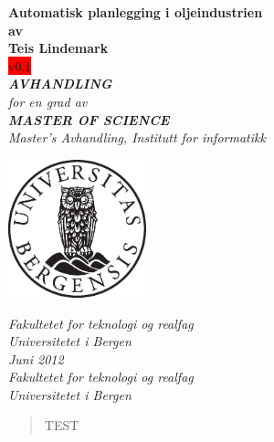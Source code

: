 \documentclass[12pt,twoside,norsk,onecolumn]{article}
\begin{document}
\newcommand{\versjon}{v0.1}

\thispagestyle{empty}
\begin{center}        %
  \vspace{5mm}          %
  \LARGE
  \textbf{Automatisk planlegging i oljeindustrien} \\
  \Large
  \vspace{5mm}
  \textbf{av} \\
  \vspace{5mm}
  \large
  \textbf{Teis Lindemark} \\
  \colorbox{red}{\versjon} \\
  \vspace{30mm}
  \Large
  {\bf{\textsl{AVHANDLING}}} \\
  \textsl{for en grad av} \\
  \vspace{2mm}
  {\bf{\textsl{MASTER OF SCIENCE}}} \\
  \vspace{5mm}
  {\large \textsl {Master's Avhandling, Institutt for informatikk}}\\
  \vspace{10mm}
  \centerline{\includegraphics[width=4cm,height=4cm]{uibugle}}
  \vspace{5mm}
  \textsl{Fakultetet for teknologi og realfag} \\
  \textsl{Universitetet i Bergen} \\
  \vspace{10mm}
  \large
  \textsl{Juni 2012} \\
  \vspace{5mm}
  \normalsize
  \textsl{Fakultetet for teknologi og realfag} \\
  \textsl{Universitetet i Bergen} \\
\end{center}
\newpage
\vspace*{\fill}
\begin{abstract}
TEST
\end{abstract}
\vspace*{\fill}
\newpage
\end{document}
